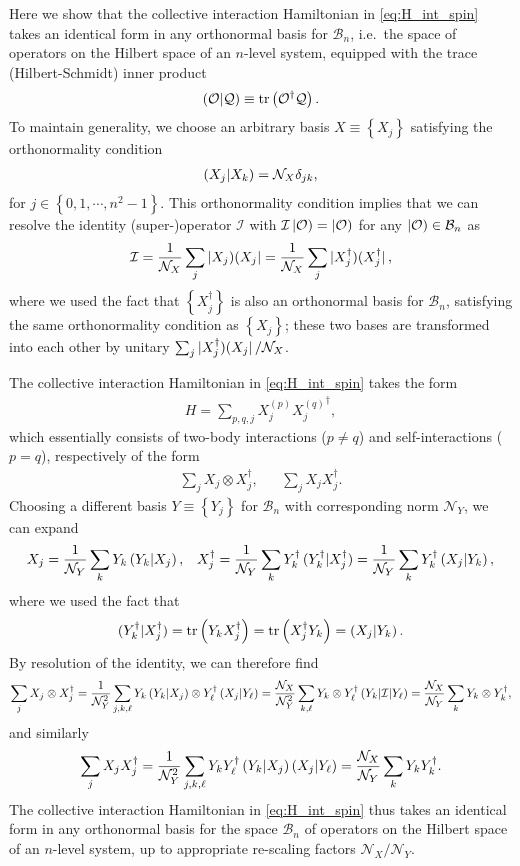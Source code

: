 \documentclass[nofootinbib,notitlepage,11pt]{revtex4-2}
\newcommand{\f}[2]{\dfrac{#1}{#2}} %
\newcommand{\p}[1]{\left(#1\right)} %
\renewcommand{\set}[1]{\left\{#1\right\}} %
\newcommand{\1}{\mathds{1}}
\newcommand{\B}{\mathcal{B}}
\newcommand{\I}{\mathcal{I}}
\newcommand{\N}{\mathcal{N}}
\renewcommand{\O}{\mathcal{O}}
\newcommand{\Q}{\mathcal{Q}}
\def\obra#1{\mathinner{({#1}|}}
\def\oket#1{\mathinner{|{#1})}}
\def\obk#1{\mathinner{({#1})}}
\def\oop#1#2{\oket{#1}\!\obra{#2}}
\begin{document}
Here we show that the collective interaction Hamiltonian in
\eqref{eq:H_int_spin} takes an identical form in any orthonormal basis
for $\B_n$, i.e.~the space of operators on the Hilbert space of an
$n$-level system, equipped with the trace (Hilbert-Schmidt) inner
product
\begin{align}
  \obk{\O|\Q} \equiv \tr\p{\O^\dag \Q}.
\end{align}
To maintain generality, we choose an arbitrary basis
$X\equiv\set{X_j}$ satisfying the orthonormality condition
\begin{align}
  \obk{X_j|X_k} = \N_X \delta_{jk},
\end{align}
for $j\in\set{0,1,\cdots,n^2-1}$.  This orthonormality condition
implies that we can resolve the identity (super-)operator $\I$ with
$\I\oket{\O}=\oket{\O}$ for any $\oket\O\in\B_n$ as
\begin{align}
  \I = \f1{\N_X} \sum_j \oop{X_j}{X_j}
  = \f1{\N_X} \sum_j \oop{X_j^\dag}{X_j^\dag},
\end{align}
where we used the fact that $\set{X_j^\dag}$ is also an orthonormal
basis for $\B_n$, satisfying the same orthonormality condition as
$\set{X_j}$; these two bases are transformed into each other by
unitary $\sum_j\oop{X_j^\dag}{X_j}/\N_X$.

The collective interaction Hamiltonian in \eqref{eq:H_int_spin} takes
the form
\begin{align}
  H = \sum_{p,q,j} X_j^{(p)} {X_j^{(q)}}^\dag,
\end{align}
which essentially consists of two-body interactions ($p\ne q$) and
self-interactions ($p=q$), respectively of the form
\begin{align}
  \sum_j X_j \otimes X_j^\dag,
  &&
  \sum_j X_j X_j^\dag.
\end{align}
Choosing a different basis $Y\equiv\set{Y_j}$ for $\B_n$ with
corresponding norm $\N_Y$, we can expand
\begin{align}
  X_j = \f1{\N_Y} \sum_k Y_k \obk{Y_k|X_j},
  &&
  X_j^\dag = \f1{\N_Y} \sum_k Y_k^\dag \obk{Y_k^\dag|X_j^\dag}
  = \f1{\N_Y} \sum_k Y_k^\dag \obk{X_j|Y_k},
\end{align}
where we used the fact that
\begin{align}
  \obk{Y_k^\dag|X_j^\dag}
  = \tr\p{Y_k X_j^\dag}
  = \tr\p{X_j^\dag Y_k}
  = \obk{X_j|Y_k}.
\end{align}
By resolution of the identity, we can therefore find
\begin{align}
  \sum_j X_j \otimes X_j^\dag
  = \f1{\N_Y^2} \sum_{j,k,\ell} Y_k \obk{Y_k|X_j}
  \otimes Y_\ell^\dag \obk{X_j|Y_\ell}
  = \f{\N_X}{\N_Y^2} \sum_{k,\ell} Y_k \otimes Y_\ell^\dag
  \obk{Y_k|\I|Y_\ell}
  = \f{\N_X}{\N_Y} \sum_k Y_k \otimes Y_k^\dag,
\end{align}
and similarly
\begin{align}
  \sum_j X_j X_j^\dag
  = \f1{\N_Y^2} \sum_{j,k,\ell} Y_k Y_\ell^\dag
  \obk{Y_k|X_j} \obk{X_j|Y_\ell}
  = \f{\N_X}{\N_Y} \sum_k Y_k Y_k^\dag.
\end{align}
The collective interaction Hamiltonian in \eqref{eq:H_int_spin} thus
takes an identical form in any orthonormal basis for the space $\B_n$
of operators on the Hilbert space of an $n$-level system, up to
appropriate re-scaling factors $\N_X/\N_Y$.
\end{document}
